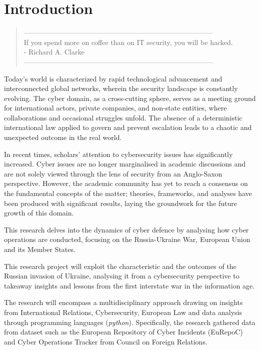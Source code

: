 \chapter*{Introduction}
{}


\begin{quote}
\centering
--------------------------------------------------------------------------------- \\
If you spend more on coffee than on IT security, you will be hacked.
\\ - Richard A. Clarke
--------------------------------------------------------------------------------- \\
\end{quote}

Today's world is characterized by rapid technological advancement and interconnected global networks, wherein the security landscape is constantly evolving. The cyber domain, as a cross-cutting sphere, serves as a meeting ground for international actors, private companies, and non-state entities, where collaborations and occasional struggles unfold. The absence of a deterministic international law applied to govern and prevent escalation leads to a chaotic and unexpected outcome in the real world.

In recent times, scholars' attention to cybersecurity issues has significantly increased. Cyber issues are no longer marginalised in academic discussions and are not solely viewed through the lens of security from an Anglo-Saxon perspective. However, the academic community has yet to reach a consensus on the fundamental concepts of the matter; theories, frameworks, and analyses have been produced with significant results, laying the groundwork for the future growth of this domain.

This research delves into the dynamics of cyber defence by analysing how cyber operations are conducted, focusing on the Russia-Ukraine War, European Union and its Member States. 

This research project will exploit the characteristic and the outcomes of the Russian invasion of Ukraine, analysing it from a cybersecurity perspective to takeaway insights and lessons from the first interstate war in the information age. 

The research will encompass a multidisciplinary approach drawing on insights from International Relations, Cybersecurity, European Law and data analysis through programming languages (\textit{python}). Specifically, the research gathered data from dataset such as the European Repository of Cyber Incidents (EuRepoC) and Cyber Operations Tracker from Council on Foreign Relations. 

